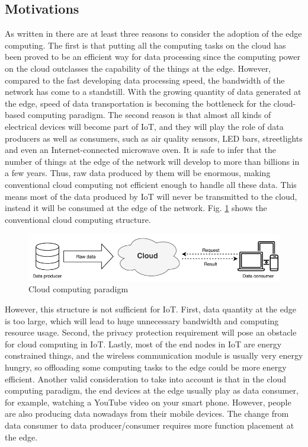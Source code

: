 \subsection{Motivations}
As written in \cite{edgecomputingvision} there are at least three reasons to consider the adoption of the edge computing. The first is that putting all the computing tasks on the cloud has been proved to be an efficient way for data processing since the computing power on the cloud outclasses the capability of the things at the edge. However, compared to the fast developing data processing speed, the bandwidth of the network has come to a standstill. With the growing quantity of data generated at the edge, speed of data transportation is becoming the bottleneck for the cloud-based computing paradigm.
The second reason is that almost all kinds of electrical devices will become part of IoT, and they will play the role of data producers as well as consumers, such as air quality sensors, LED bars, streetlights and even an Internet-connected microwave oven. It is safe to infer that the number of things at the edge of the network will develop to more than billions in a few
years. Thus, raw data produced by them will be enormous, making conventional cloud computing not efficient enough to handle all these data. This means most of the data produced by IoT will never be transmitted to the cloud, instead it will be consumed at the edge of the network. Fig. \ref{fig:cloudarch} shows the conventional cloud computing structure.

\begin{figure}
	\includegraphics[width=\linewidth]{images/cloudarch}
	\caption{Cloud computing paradigm}
	\label{fig:cloudarch}
\end{figure}

However, this structure is not sufficient for IoT. First, data quantity at the edge is too large, which will lead to huge unnecessary bandwidth and computing resource usage. Second, the privacy protection requirement will pose an obstacle for cloud computing in IoT. Lastly, most of the end nodes in IoT are energy constrained things, and the wireless communication module is usually very energy hungry, so offloading some computing tasks to the edge could be more energy efficient.
Another valid consideration to take into account is that in the cloud computing paradigm, the end devices at the edge usually play as data consumer, for example, watching a YouTube video on
your smart phone. However, people are also producing data nowadays from their mobile devices. The change from data consumer to data producer/consumer requires more function placement at the edge.


